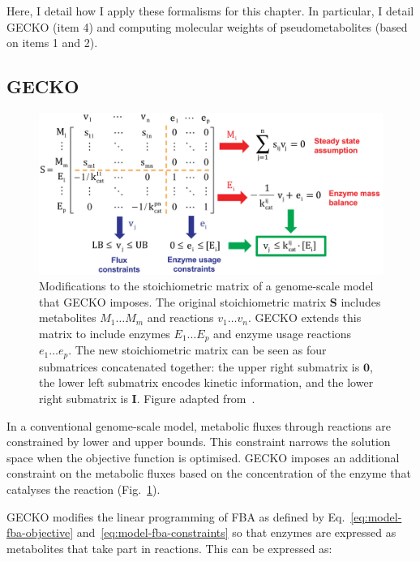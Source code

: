 Here, I detail how I apply these formalisms for this chapter.
In particular, I detail GECKO (item 4) and computing molecular weights of pseudometabolites (based on items 1 and 2).


\subsection{GECKO}
\label{subsec:model-yeast8-gecko}

\begin{figure}
  \centering
  \includegraphics[width=0.9\linewidth]{sanchezImprovingPhenotypePredictions2017_1b_adapted}
  \caption[
    Modifications to the stoichiometric matrix of a genome-scale model that GECKO imposes
  ]{
    Modifications to the stoichiometric matrix of a genome-scale model that GECKO imposes.
    The original stoichiometric matrix $\mathbf{S}$ includes metabolites $M_{1} \ldots M_{m}$ and reactions $v_{1} \ldots v_{n}$.
    GECKO extends this matrix to include enzymes $E_{1} \ldots E_{p}$ and enzyme usage reactions $e_{1} \ldots e_{p}$.
    The new stoichiometric matrix can be seen as four submatrices concatenated together: the upper right submatrix is $\mathbf{0}$, the lower left submatrix encodes kinetic information, and the lower right submatrix is $\mathbf{I}$.
    Figure adapted from~\textcite{sanchezImprovingPhenotypePredictions2017}.
  }
  \label{fig:model-gecko}
\end{figure}

In a conventional genome-scale model, metabolic fluxes through reactions are constrained by lower and upper bounds.
This constraint narrows the solution space when the objective function is optimised.
GECKO imposes an additional constraint on the metabolic fluxes based on the concentration of the enzyme that catalyses the reaction (Fig.\ \ref{fig:model-gecko}).

GECKO modifies the linear programming of FBA as defined by Eq.\ \ref{eq:model-fba-objective} and~\ref{eq:model-fba-constraints} so that enzymes are expressed as metabolites that take part in reactions.
This can be expressed as:


